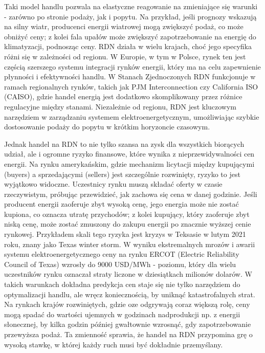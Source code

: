 Taki model handlu pozwala na elastyczne reagowanie na zmieniające się warunki - zarówno po stronie podaży, jak i popytu. Na przykład, jeśli prognozy wskazują na silny wiatr, producenci energii wiatrowej mogą zwiększyć podaż, co może obniżyć ceny; z kolei fala upałów może zwiększyć zapotrzebowanie na energię do klimatyzacji, podnosząc ceny. RDN działa w wielu krajach, choć jego specyfika różni się w zależności od regionu. W Europie, w tym w Polsce, rynek ten jest częścią szerszego systemu integracji rynków energii, który ma na celu zapewnienie płynności i efektywności handlu. W Stanach Zjednoczonych RDN funkcjonuje w ramach regionalnych rynków, takich jak PJM Interconnection czy California ISO (CAISO), gdzie handel energią jest dodatkowo skomplikowany przez różnice regulacyjne między stanami. Niezależnie od regionu, RDN jest kluczowym narzędziem w zarządzaniu systemem elektroenergetycznym, umożliwiając szybkie dostosowanie podaży do popytu w krótkim horyzoncie czasowym.

Jednak handel na RDN to nie tylko szansa na zysk dla wszystkich biorących udział, ale i ogromne ryzyko finansowe, które wynika z nieprzewidywalności cen energii. Na rynku amerykańskim, gdzie mechanizm licytacji między kupującymi (buyers) a sprzedającymi (sellers) jest szczególnie rozwinięty, ryzyko to jest wyjątkowo widoczne. Uczestnicy rynku muszą składać oferty w czasie rzeczywistym, próbując przewidzieć, jak zachowa się cena w danej godzinie. Jeśli producent energii zaoferuje zbyt wysoką cenę, jego energia może nie zostać kupiona, co oznacza utratę przychodów; z kolei kupujący, który zaoferuje zbyt niską cenę, może zostać zmuszony do zakupu energii po znacznie wyższej cenie rynkowej. Przykładem skali tego ryzyka jest kryzys w Teksasie \cite{BUSBY2021102106} w lutym 2021 roku, znany jako Texas winter storm. W wyniku ekstremalnych mrozów i awarii systemu elektroenergetycznego ceny na rynku ERCOT (Electric Reliability Council of Texas) wzrosły do 9000 USD/MWh - poziomu, który dla wielu uczestników rynku oznaczał straty liczone w dziesiątkach milionów dolarów. W takich warunkach dokładna predykcja cen staje się nie tylko narzędziem do optymalizacji handlu, ale wręcz koniecznością, by uniknąć katastrofalnych strat. Na rynkach krajów rozwiniętych, gdzie \gls{oze} odgrywają coraz większą rolę, ceny mogą spadać do wartości ujemnych w godzinach nadprodukcji np. z energii słonecznej, by kilka godzin później gwałtownie wzrosnąć, gdy zapotrzebowanie przewyższa podaż. Ta zmienność sprawia, że handel na RDN przypomina grę o wysoką stawkę, w której każdy ruch musi być dokładnie przemyślany.

